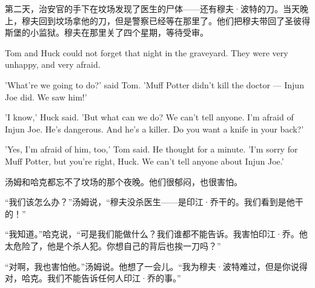 \documentclass[fontset=ubuntu, zihao=5]{ctexart}
\begin{document}
\begin{paracol}{2}
\switchcolumn

\sectionbreak

第二天，治安官的手下在坟场发现了医生的尸体——还有穆夫·波特的刀。当天晚上，穆夫回到坟场拿他的刀，但是警察已经等在那里了。他们把穆夫带回了圣彼得斯堡的小监狱。穆夫在那里关了四个星期，等待受审。

\switchcolumn*

\sectionbreak

Tom and Huck could not forget that night in the graveyard. They were very unhappy, and very afraid.

'What're we going to do?' said Tom. 'Muff Potter didn't kill the doctor — Injun Joe did. We saw him!'

'I know,' Huck said. 'But what can we do? We can't tell anyone. I'm afraid of Injun Joe. He's dangerous. And he's a killer. Do you want a knife in your back?'

'Yes, I'm afraid of him, too,' Tom said. He thought for a minute. 'I'm sorry for Muff Potter, but you're right, Huck. We can't tell anyone about Injun Joe.'

\switchcolumn

\sectionbreak

汤姆和哈克都忘不了坟场的那个夜晚。他们很郁闷，也很害怕。

“我们该怎么办？”汤姆说，“穆夫没杀医生——是印江·乔干的。我们看到是他干的！”

“我知道。”哈克说，“可是我们能做什么？我们谁都不能告诉。我害怕印江·乔。他太危险了，他是个杀人犯。你想自己的背后也挨一刀吗？”

“对啊，我也害怕他。”汤姆说。他想了一会儿。“我为穆夫·波特难过，但是你说得对，哈克。我们不能告诉任何人印江·乔的事。”

\end{paracol}



%  
\end{document}
